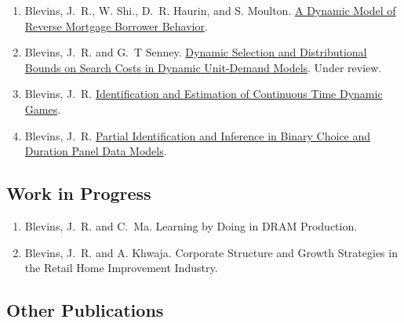 \documentclass[10pt,letterpaper]{article}
\renewenvironment{itemize}{
  \begin{list}{}{
    \setlength{\leftmargin}{1.5em}
    \setlength{\itemsep}{0.25em}
    \setlength{\parskip}{0pt}
    \setlength{\parsep}{0.25em}
  }
}{
  \end{list}
}
\begin{document}
\begin{enumerate}[resume]
\item Blevins, J.~R., W. Shi., D.~R. Haurin, and S. Moulton.
  \href{http://jblevins.org/research/ddc-hecm}{A Dynamic Model of Reverse Mortgage Borrower Behavior}.
\item Blevins, J.~R. and G.~T Senney.
  \href{http://jblevins.org/research/dcs}{Dynamic Selection and Distributional Bounds on Search Costs in Dynamic Unit-Demand Models}.
  Under review.
\item Blevins, J.~R.
  \href{http://jblevins.org/research/ctgames}{Identification and Estimation of Continuous Time Dynamic Games}.
\item Blevins, J.~R.
  \href{http://jblevins.org/research/panel}{Partial Identification and Inference in Binary Choice and Duration Panel Data Models}.
\end{enumerate}

\subsection*{Work in Progress}

\begin{enumerate}[resume]
\item Blevins, J.~R. and C.~Ma.
    Learning by Doing in DRAM Production.
\item Blevins, J.~R. and A. Khwaja.
    Corporate Structure and Growth Strategies in the Retail Home Improvement Industry.
\end{enumerate}

%

\subsection*{Other Publications}
\end{document}
